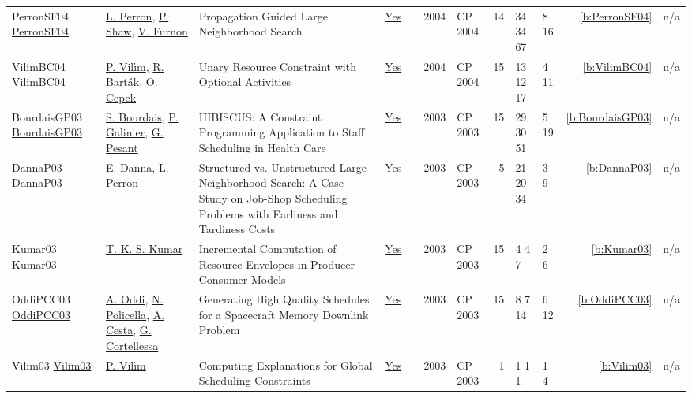 {\begin{longtable}{>{\raggedright\arraybackslash}p{3cm}>{\raggedright\arraybackslash}p{4.5cm}>{\raggedright\arraybackslash}p{6.0cm}rrrp{2.5cm}rp{1cm}p{1cm}rr}
PerronSF04 \href{https://doi.org/10.1007/978-3-540-30201-8_35}{PerronSF04} & \hyperref[auth:a288]{L. Perron}, \hyperref[auth:a120]{P. Shaw}, \hyperref[auth:a1072]{V. Furnon} & Propagation Guided Large Neighborhood Search & \href{../works/PerronSF04.pdf}{Yes} & \cite{PerronSF04} & 2004 & CP 2004 & 14 & 34 34 67 & 8 16 & \ref{b:PerronSF04} & n/a\\
VilimBC04 \href{https://doi.org/10.1007/978-3-540-30201-8_8}{VilimBC04} & \hyperref[auth:a121]{P. Vil{\'{\i}}m}, \hyperref[auth:a152]{R. Bart{\'{a}}k}, \hyperref[auth:a161]{O. Cepek} & Unary Resource Constraint with Optional Activities & \href{../works/VilimBC04.pdf}{Yes} & \cite{VilimBC04} & 2004 & CP 2004 & 15 & 13 12 17 & 4 11 & \ref{b:VilimBC04} & n/a\\
BourdaisGP03 \href{https://doi.org/10.1007/978-3-540-45193-8_11}{BourdaisGP03} & \hyperref[auth:a1205]{S. Bourdais}, \hyperref[auth:a1206]{P. Galinier}, \hyperref[auth:a8]{G. Pesant} & {HIBISCUS:} {A} Constraint Programming Application to Staff Scheduling in Health Care & \href{../works/BourdaisGP03.pdf}{Yes} & \cite{BourdaisGP03} & 2003 & CP 2003 & 15 & 29 30 51 & 5 19 & \ref{b:BourdaisGP03} & n/a\\
DannaP03 \href{https://doi.org/10.1007/978-3-540-45193-8_59}{DannaP03} & \hyperref[auth:a287]{E. Danna}, \hyperref[auth:a288]{L. Perron} & Structured vs. Unstructured Large Neighborhood Search: {A} Case Study on Job-Shop Scheduling Problems with Earliness and Tardiness Costs & \href{../works/DannaP03.pdf}{Yes} & \cite{DannaP03} & 2003 & CP 2003 & 5 & 21 20 34 & 3 9 & \ref{b:DannaP03} & n/a\\
Kumar03 \href{https://doi.org/10.1007/978-3-540-45193-8_45}{Kumar03} & \hyperref[auth:a286]{T. K. S. Kumar} & Incremental Computation of Resource-Envelopes in Producer-Consumer Models & \href{../works/Kumar03.pdf}{Yes} & \cite{Kumar03} & 2003 & CP 2003 & 15 & 4 4 7 & 2 6 & \ref{b:Kumar03} & n/a\\
OddiPCC03 \href{https://doi.org/10.1007/978-3-540-45193-8_39}{OddiPCC03} & \hyperref[auth:a282]{A. Oddi}, \hyperref[auth:a283]{N. Policella}, \hyperref[auth:a284]{A. Cesta}, \hyperref[auth:a285]{G. Cortellessa} & Generating High Quality Schedules for a Spacecraft Memory Downlink Problem & \href{../works/OddiPCC03.pdf}{Yes} & \cite{OddiPCC03} & 2003 & CP 2003 & 15 & 8 7 14 & 6 12 & \ref{b:OddiPCC03} & n/a\\
Vilim03 \href{https://doi.org/10.1007/978-3-540-45193-8_124}{Vilim03} & \hyperref[auth:a121]{P. Vil{\'{\i}}m} & Computing Explanations for Global Scheduling Constraints & \href{../works/Vilim03.pdf}{Yes} & \cite{Vilim03} & 2003 & CP 2003 & 1 & 1 1 1 & 1 4 & \ref{b:Vilim03} & n/a\\

\end{longtable}}
